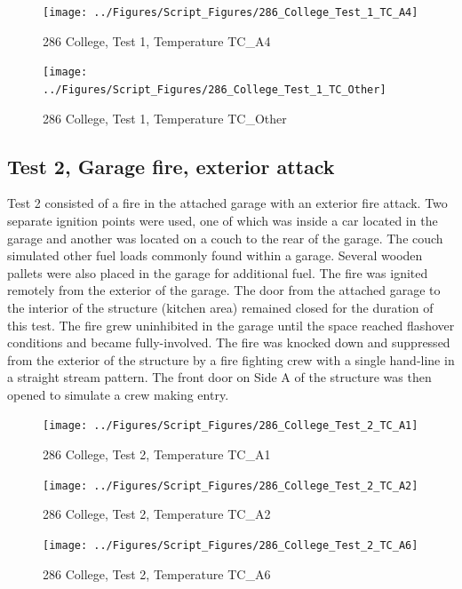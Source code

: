 \documentclass[12pt,oneside]{book}
\begin{document}
\begin{figure}[!ht]
\texttt{[image: ../Figures/Script\_Figures/286\_College\_Test\_1\_TC\_A4]}
\caption{286 College, Test 1, Temperature TC\_A4}
\label{fig:286_College_Test_1_TC_A4}
\end{figure}

\begin{figure}[!ht]
\texttt{[image: ../Figures/Script\_Figures/286\_College\_Test\_1\_TC\_Other]}
\caption{286 College, Test 1, Temperature TC\_Other}
\label{fig:286_College_Test_1_TC_Other}
\end{figure}


\clearpage


\subsection{Test 2, Garage fire, exterior attack}

Test 2 consisted of a fire in the attached garage with an exterior fire attack. Two separate ignition points were used, one of which was inside a car located in the garage and another was located on a couch to the rear of the garage. The couch simulated other fuel loads commonly found within a garage. Several wooden pallets were also placed in the garage for additional fuel. The fire was ignited remotely from the exterior of the garage. The door from the attached garage to the interior of the structure (kitchen area) remained closed for the duration of this test. The fire grew uninhibited in the garage until the space reached flashover conditions and became fully-involved. The fire was knocked down and suppressed from the exterior of the structure by a fire fighting crew with a single hand-line in a straight stream pattern. The front door on Side A of the structure was then opened to simulate a crew making entry. 

\begin{figure}[!ht]
\texttt{[image: ../Figures/Script\_Figures/286\_College\_Test\_2\_TC\_A1]}
\caption{286 College, Test 2, Temperature TC\_A1}
\label{fig:286_College_Test_2_TC_A1}
\end{figure}

\begin{figure}[!ht]
\texttt{[image: ../Figures/Script\_Figures/286\_College\_Test\_2\_TC\_A2]}
\caption{286 College, Test 2, Temperature TC\_A2}
\label{fig:286_College_Test_2_TC_A2}
\end{figure}

\begin{figure}[!ht]
\texttt{[image: ../Figures/Script\_Figures/286\_College\_Test\_2\_TC\_A6]}
\caption{286 College, Test 2, Temperature TC\_A6}
\label{fig:286_College_Test_2_TC_A6}
\end{figure}
\end{document}

